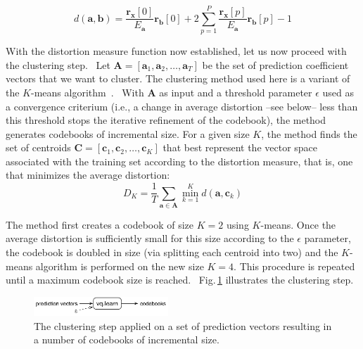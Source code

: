 \documentclass[letterpaper,12pt]{article}
\newcommand{\bA}{\ensuremath{\mathbf{A}}}
\newcommand{\ba}{\ensuremath{\mathbf{a}}}
\newcommand{\bb}{\ensuremath{\mathbf{b}}}
\newcommand{\bc}{\ensuremath{\mathbf{c}}}
\newcommand{\bx}{\ensuremath{\mathbf{x}}}
\newcommand{\br}{\ensuremath{\mathbf{r}}}
\newcommand{\bC}{\ensuremath{\mathbf{C}}}
\begin{document}
    \begin{equation}
        d(\ba,\bb) = \frac{\br_\bx[0]}{E_\ba} \br_\bb[0] + 2 \sum_{p = 1}^P \frac{\br_\bx[p]}{E_\ba} \br_\bb[p]
                     - 1
                     \label{eq-dist}
    \end{equation}

    With the distortion measure function now established,
    let us now proceed with the clustering step.
    \
    Let $\bA = [ \ba_1, \ba_2, \ldots, \ba_T ]$
    be the set of prediction coefficient vectors that we want to cluster.
    The clustering method used here is a variant of the $K$-means algorithm~\citep{LBG:80,Parsons:87}.
    \
    With $\bA$ as input and a threshold parameter $\epsilon$ used as a convergence criterium
    (i.e., a change in average distortion --see below-- less than this threshold stops the iterative
    refinement of the codebook),
    the method generates codebooks of incremental size.
    For a given size $K$, the method finds the set of centroids
    $\bC = [ \bc_1, \bc_2, \ldots, \bc_K ]$
    that best represent the vector space associated with the training
    set according to the distortion measure, that is,
    one that minimizes the average distortion:
    \begin{equation}
        D_K = { \frac{1}{T} } \sum_{\ba \in \bA} \min\limits_{k=1}^{K} d(\ba,\bc_k) \label{eq-Dk}
    \end{equation}

    The method first creates a
    codebook of size $K=2$ using $K$-means.
    Once the average distortion is sufficiently small for this size
    according to the $\epsilon$ parameter,
    the codebook is doubled in size (via splitting each centroid into two)
    and the $K$-means algorithm is performed on the new size $K=4$.
    This procedure is repeated until a maximum codebook size is reached.
    \
    Fig.\,\ref{fig:clustering-step} illustrates the clustering step.

    \begin{figure}[!ht]
        \centering
        \includegraphics[width=0.45\textwidth]{clustering.pdf}
        \caption{
        The clustering step applied on a set of prediction vectors resulting in a
        number of codebooks of incremental size.
        }
        \label{fig:clustering-step}
    \end{figure}
\end{document}
